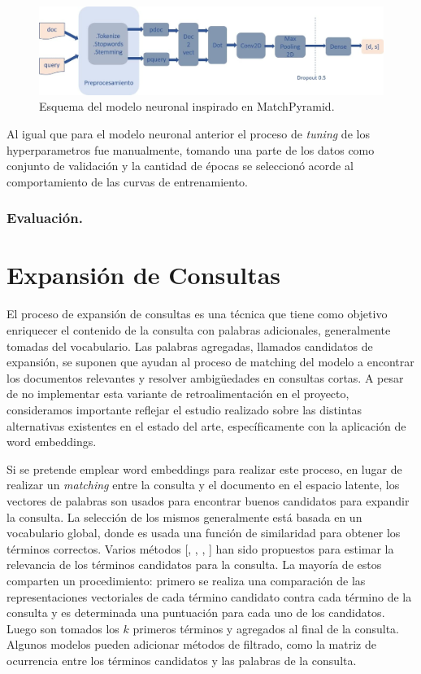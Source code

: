\documentclass{llncs}
\begin{document}
\begin{figure}
	\begin{center}
		\includegraphics[width=\linewidth]{ ./images/match.jpg}
		\caption{Esquema del modelo neuronal inspirado en MatchPyramid.}
		\label{matchpyramid}
	\end{center}
\end{figure}

Al igual que para el modelo neuronal anterior el proceso de \textit{tuning} de los hyperparametros fue manualmente, tomando una parte de los datos como conjunto de validación y la cantidad de épocas se seleccionó acorde al comportamiento de las curvas de entrenamiento.

\subsubsection{Evaluación.}

\section{Expansión de Consultas}
El proceso de expansión de consultas es una técnica que tiene como objetivo enriquecer el contenido de la consulta con palabras adicionales, generalmente tomadas del vocabulario. Las palabras agregadas, llamados candidatos de expansión, se suponen que ayudan al proceso de matching del modelo a encontrar los documentos relevantes y resolver ambig\"uedades en consultas cortas. A pesar de no implementar esta variante de retroalimentación en el proyecto, consideramos importante reflejar el estudio realizado sobre las distintas alternativas existentes en el estado del arte, específicamente con la aplicación de word embeddings.  

Si se pretende emplear word embeddings para realizar este proceso, en lugar de realizar un \textit{matching} entre la consulta y el documento en el espacio latente, los vectores de palabras son usados para encontrar buenos candidatos para expandir la consulta. La selección de los mismos generalmente está basada en un vocabulario global, donde es usada una función de similaridad para obtener los términos correctos. Varios métodos [\cite{160}, \cite{190}, \cite{191}, \cite{165}] han sido propuestos para estimar la relevancia de los términos candidatos para la consulta. La mayoría de estos comparten un procedimiento: primero se realiza una comparación de las representaciones vectoriales de cada término candidato contra cada término de la consulta y es determinada una puntuación para cada uno de los candidatos. Luego son tomados los $k$ primeros términos y agregados al final de la consulta. Algunos modelos \cite{192} pueden adicionar métodos de filtrado, como la matriz de ocurrencia entre los términos candidatos y las palabras de la consulta. 
\end{document}
